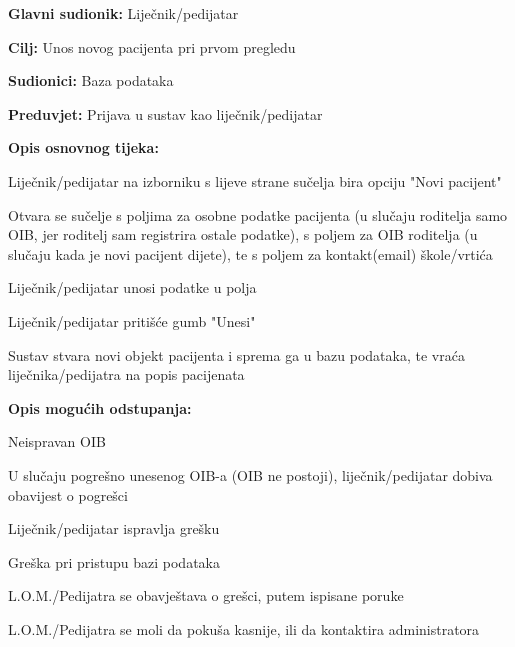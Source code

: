 					\noindent {}
					\begin{packed_item}
						
						\item \textbf{Glavni sudionik: }Liječnik/pedijatar
						\item  \textbf{Cilj:} Unos novog pacijenta pri prvom pregledu
						\item  \textbf{Sudionici:} Baza podataka
						\item  \textbf{Preduvjet:} Prijava u sustav kao liječnik/pedijatar
						\item  \textbf{Opis osnovnog tijeka:}
						
						\item[] \begin{packed_enum}
							
							\item Liječnik/pedijatar na izborniku s lijeve strane sučelja bira opciju "Novi pacijent"
							\item Otvara se sučelje s poljima za osobne podatke pacijenta (u slučaju roditelja samo OIB, jer roditelj sam registrira ostale podatke), s poljem za OIB roditelja (u slučaju kada je novi pacijent dijete), te s poljem za kontakt(email) škole/vrtića
							\item Liječnik/pedijatar unosi podatke u polja
							\item Liječnik/pedijatar pritišće gumb "Unesi"
							\item Sustav stvara novi objekt pacijenta i sprema ga u bazu podataka, te vraća liječnika/pedijatra na popis pacijenata
							
						\end{packed_enum}
						
						\item  \textbf{Opis mogućih odstupanja:}
						
						\item[] \begin{packed_item}
							\item[3.a] Neispravan OIB
							\item[] \begin{packed_enum}
								\item U slučaju pogrešno unesenog OIB-a (OIB ne postoji), liječnik/pedijatar dobiva obavijest o pogrešci
								\item Liječnik/pedijatar ispravlja grešku
							\end{packed_enum}	
							\item[5.a] Greška pri pristupu bazi podataka
							\item[] \begin{packed_enum}
								
								\item L.O.M./Pedijatra se obavještava o grešci, putem ispisane poruke
								\item L.O.M./Pedijatra se moli da pokuša kasnije, ili da kontaktira administratora
								
							\end{packed_enum}
						\end{packed_item}
					\end{packed_item}
					
